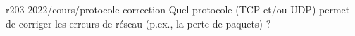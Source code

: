 \begin{question}{r203-2022/cours/protocole-correction}
  Quel protocole (TCP et/ou UDP) permet de corriger les erreurs de
  réseau (p.ex., la perte de paquets) ?
  \begin{reponses}
  \end{reponses}
\end{question}
